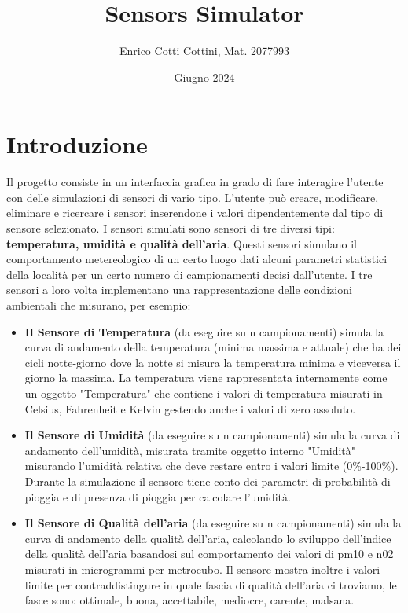 \documentclass{article}
\title{ \textbf{Sensors Simulator} }
\author{Enrico Cotti Cottini, Mat. 2077993}
\date{Giugno 2024}
\begin{document}
\maketitle

\tableofcontents %

\newpage

\section{Introduzione}

Il progetto consiste in un interfaccia grafica in grado di fare interagire l'utente con delle simulazioni di sensori di vario tipo. L'utente può creare, modificare, eliminare e ricercare i sensori inserendone i valori dipendentemente dal tipo di sensore selezionato. I sensori simulati sono sensori di tre diversi tipi: \textbf{temperatura, umidità e qualità dell'aria}. Questi sensori simulano il comportamento metereologico di un certo luogo dati alcuni parametri statistici della località per un certo numero di campionamenti decisi dall'utente. I tre sensori a loro volta implementano una rappresentazione delle condizioni ambientali che misurano, per esempio: 

\begin{itemize}
    \item \textbf{Il Sensore di Temperatura} (da eseguire su n campionamenti) simula la curva di andamento della temperatura (minima massima e attuale) che ha dei cicli notte-giorno dove la notte si misura la temperatura minima e viceversa il giorno la massima. La temperatura viene rappresentata internamente come un oggetto "Temperatura" che contiene i valori di temperatura misurati in Celsius, Fahrenheit e Kelvin gestendo anche i valori di zero assoluto. 
    
    \item \textbf{Il Sensore di Umidità} (da eseguire su n campionamenti) simula la curva di andamento dell'umidità, misurata tramite oggetto interno "Umidità" misurando l'umidità relativa che deve restare entro i valori limite (0\%-100\%). Durante la simulazione il sensore tiene conto dei parametri di probabilità di pioggia e di presenza di pioggia per calcolare l'umidità.
    
    \item\textbf{Il Sensore di Qualità dell'aria}  (da eseguire su n campionamenti) simula la curva di andamento della qualità dell'aria, calcolando lo sviluppo dell'indice della qualità dell'aria basandosi sul comportamento dei valori di pm10 e n02 misurati in microgrammi per metrocubo. Il sensore mostra inoltre i valori limite per contraddistingure in quale fascia di qualità dell'aria ci troviamo, le fasce sono: ottimale, buona, accettabile, mediocre, carente, malsana. 
\end{itemize}
\end{document}
